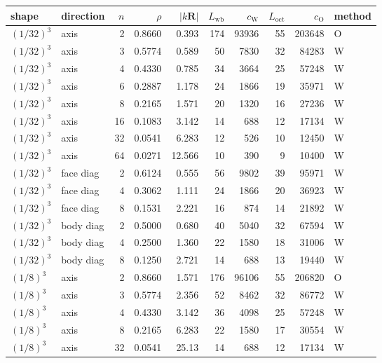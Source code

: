 \begin{center}\footnotesize
\begin{tabular}{@{}llrrrrrrrl@{}}
\toprule
shape & direction & $n$ & $\rho$ & $|k\mathbf{R}|$
& $L_{\mathrm{wb}}$ & $c_{\mathrm{W}}$ & $L_{\mathrm{oct}}$ & $c_{\mathrm{O}}$ & method\\
\midrule
$(1/32)^3$ & axis      & 2  & 0.8660 & 0.393  & 174 & 93936 & 55 & 203648 & O\\
$(1/32)^3$ & axis      & 3  & 0.5774 & 0.589  & 50  & 7830  & 32 & 84283  & W\\
$(1/32)^3$ & axis      & 4  & 0.4330 & 0.785  & 34  & 3664  & 25 & 57248  & W\\
$(1/32)^3$ & axis      & 6  & 0.2887 & 1.178  & 24  & 1866  & 19 & 35971  & W\\
$(1/32)^3$ & axis      & 8  & 0.2165 & 1.571  & 20  & 1320  & 16 & 27236  & W\\
$(1/32)^3$ & axis      & 16 & 0.1083 & 3.142  & 14  & 688   & 12 & 17134  & W\\
$(1/32)^3$ & axis      & 32 & 0.0541 & 6.283  & 12  & 526   & 10 & 12450  & W\\
$(1/32)^3$ & axis      & 64 & 0.0271 & 12.566 & 10  & 390   & 9  & 10400  & W\\
$(1/32)^3$ & face diag & 2  & 0.6124 & 0.555  & 56  & 9802  & 39 & 95971  & W\\
$(1/32)^3$ & face diag & 4  & 0.3062 & 1.111  & 24  & 1866  & 20 & 36923  & W\\
$(1/32)^3$ & face diag & 8  & 0.1531 & 2.221  & 16  & 874   & 14 & 21892  & W\\
$(1/32)^3$ & body diag & 2  & 0.5000 & 0.680  & 40  & 5040  & 32 & 67594  & W\\
$(1/32)^3$ & body diag & 4  & 0.2500 & 1.360  & 22  & 1580  & 18 & 31006  & W\\
$(1/32)^3$ & body diag & 8  & 0.1250 & 2.721  & 14  & 688   & 13 & 19440  & W\\
\midrule
$(1/8)^3$  & axis      & 2  & 0.8660 & 1.571  & 176 & 96106 & 55 & 206820 & O\\
$(1/8)^3$  & axis      & 3  & 0.5774 & 2.356  & 52  & 8462  & 32 & 86772  & W\\
$(1/8)^3$  & axis      & 4  & 0.4330 & 3.142  & 36  & 4098  & 25 & 57248  & W\\
$(1/8)^3$  & axis      & 8  & 0.2165 & 6.283  & 22  & 1580  & 17 & 30554  & W\\
$(1/8)^3$  & axis      & 32 & 0.0541 & 25.13  & 14  & 688   & 12 & 17134  & W\\

\end{tabular}
\end{center}
